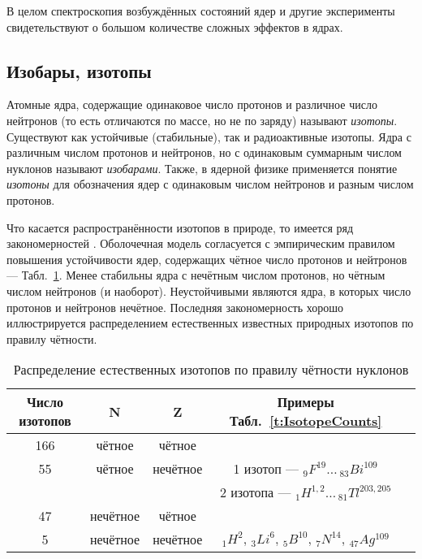 \documentclass[a5paper,openany]{book}
\begin{document}
	В целом спектроскопия возбуждённых состояний ядер и другие эксперименты свидетельствуют о большом количестве сложных эффектов в ядрах.
	
	
	
	\subsection{Изобары, изотопы} \label{IsobarsIsotopes}
	Атомные ядра, содержащие одинаковое число протонов и различное число нейтронов (то есть отличаются по массе, но не по заряду) называют \emph{изотопы}. Существуют как устойчивые (стабильные), так и радиоактивные изотопы. Ядра с различным числом протонов и нейтронов, но с одинаковым суммарным числом нуклонов называют \emph{изобарами}. Также, в ядерной физике применяется понятие \emph{изотоны} для обозначения ядер с одинаковым числом нейтронов и разным числом протонов.
	   
	
	Что касается распространённости изотопов в природе, то имеется ряд закономерностей \cite{Bekman}.
	Оболочечная модель согласуется с эмпирическим правилом повышения устойчивости ядер,
	содержащих чётное число протонов и нейтронов --- Табл.~\ref{t:IsotopeOddEven}. Менее стабильны ядра с нечётным числом протонов, но
	чётным числом нейтронов (и наоборот). Неустойчивыми являются ядра, в которых число протонов и
	нейтронов нечётное. Последняя закономерность хорошо иллюстрируется распределением естественных
	известных природных изотопов по правилу чётности. 
	
	\begin{table}[!h]
		{\small 
			\begin{center}
				\begin{tabular}{|c|c|c|c|c|}
					\hline
					Число изотопов & N & Z & Примеры Табл.~\ref{t:IsotopeCounts}\\
					\hline
					166 & чётное & чётное & ~ \\
					55 & чётное & нечётное & 1 изотоп --- $_{9}F^{19} \ldots \, _{83}Bi^{109} $ \\
					~ & ~ & ~ &  2 изотопа --- $_{1}H^{1, 2}  \ldots \, _{81}Tl^{203, 205}   $ \\
					47 & нечётное & чётное & ~  \\
					5 & нечётное & нечётное & $_{1}H^{2},   \,  _{3}Li^{6},  \,  _{5}B^{10},   \, _{7}N^{14},  \,  _{47}Ag^{109} $   \\
					\hline
				\end{tabular}
			\end{center}	
		}	
		\caption{Распределение естественных изотопов по правилу чётности нуклонов}
		\label{t:IsotopeOddEven}
	\end{table}
	
\end{document}
